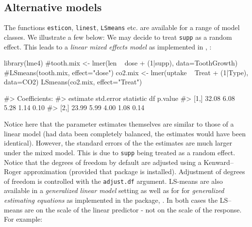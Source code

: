 \hypertarget{alternative-models}{%
\subsection{Alternative models}\label{alternative-models}}

The functions \texttt{esticon}, \texttt{linest}, \texttt{LSmeans} etc.
are available for a range of model classes. We illustrate a few below:
We may decide to treat \verb|supp| as a random effect. This leads to a
\emph{linear mixed effects model} as implemented in ,
\citep{lme4}:

\begin{Schunk}
\begin{Sinput}
library(lme4)
#tooth.mix <- lmer(len ~ dose + (1|supp), data=ToothGrowth)
#LSmeans(tooth.mix, effect="dose")
co2.mix <- lmer(uptake ~ Treat + (1|Type), data=CO2)
LSmeans(co2.mix, effect="Treat")
\end{Sinput}
\begin{Soutput}
#> Coefficients:
#>      estimate std.error statistic    df p.value
#> [1,]    32.08      6.08      5.28  1.14    0.10
#> [2,]    23.99      5.99      4.00  1.08    0.14
\end{Soutput}
\end{Schunk}

Notice here that the parameter estimates themselves are similar to those
of a linear model (had data been completely balanced, the estimates
would have been identical). However, the standard errors of the the
estimates are much larger under the mixed model. This is due to
\texttt{supp} being treated as a random effect. Notice that the degrees
of freedom by default are adjusted using a Kenward--Roger approximation
(provided that  package \citep{pbkrtest} is
installed). Adjustment of degrees of freedom is controlled with the
\texttt{adjust.df} argument. LS-means are also available in a
\emph{generalized linear model} setting as well as for for
\emph{generalized estimating equations} as implemented in the
 package, \citep{geepack}. In both cases the LS--means
are on the scale of the linear predictor - not on the scale of the
response. For example:

